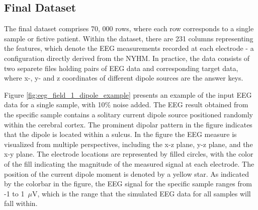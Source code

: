 \documentclass[a4paper, UKenglish, 11pt]{uiomaster}
\begin{document}
\subsection{Final Dataset}
The final dataset comprises 70, 000 rows, where each row corresponds to a single sample or fictive patient. Within the dataset, there are 231 columns representing the features, which denote the EEG measurements recorded at each electrode - a configuration directly derived from the NYHM. In practice, the data consists of two separete files holding pairs of EEG data and corresponding target data, where x-, y- and z coordinates of different dipole sources are the answer keys.

Figure \ref{fig:eeg_field_1_dipole_example} presents an example of the input EEG data for a single sample, with 10$\%$ noise added. The EEG result obtained from the specific sample contains a solitary current dipole source positioned randomly within the cerebral cortex. The prominent dipolar pattern in the figure indicates that the dipole is located within a sulcus. In the figure the EEG measure is visualized from multiple perspectives, including the x-z plane, y-z plane, and the x-y plane. The electrode locations are represented by filled circles, with the color of the fill indicating the magnitude of the measured signal at each electrode. The position of the current dipole moment is denoted by a yellow star. As indicated by the colorbar in the figure, the EEG signal for the specific sample ranges from -1 to 1~$\mu$V, which is the range that the simulated EEG data for all samples will fall within.
\end{document}
